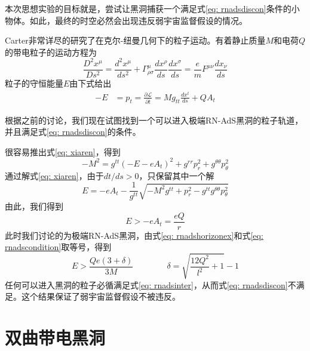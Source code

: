 本次思想实验的目标就是，尝试让黑洞捕获一个满足式\eqref{eq: rnadsdiscon}条件的小物体。如此，最终的时空必然会出现违反弱宇宙监督假设的情况\citep{wald1974gedanken}。

Carter非常详尽的研究了在克尔-纽曼几何下的粒子运动\cite{carter1968global}。有着静止质量$M$和电荷$Q$的带电粒子的运动方程为
\begin{equation}
    \frac{D^2x^\mu}{D s^2}=\frac{d^2x^\mu}{ds^2}+\Gamma^{\mu}_{\rho\sigma }\frac{dx^\rho}{ds}\frac{dx^\sigma}{ds}=\frac{e}{m}F^{\mu\nu }\frac{dx_\nu}{ds}
\end{equation}
粒子的守恒能量$E$由下式给出
\begin{align}
    -E&=p_t=\frac{\partial \mathcal{L}}{\partial \dot{t}}=Mg_{tt}\frac{dx^t}{ds}+QA_t 
\end{align}

根据之前的讨论，我们现在试图找到一个可以进入极端RN-AdS黑洞的粒子轨道，并且满足式\eqref{eq: rnadsdiscon}的条件。

很容易推出式\eqref{eq: xiaren}，得到
\begin{equation}\label{eq: xiaren}
    -M^2=g^{tt}\left(-E-eA_t\right)^2+g^{rr}p_r^2+g^{\theta \theta}p_\theta ^2
\end{equation}
通过解式\eqref{eq: xiaren}，由于$dt/ds>0$，只保留其中一个解
\begin{equation}\label{eq: rnadsguidao}
    E=-eA_t -\frac{1}{g^{tt}}\sqrt{-M^2g^{tt}+p_r^2-g^{tt}g^{\theta \theta}p_{\theta}^2}
\end{equation}
由此，我们得到
\begin{equation}
    E>-eA_t=\frac{eQ}{r}
\end{equation}
此时我们讨论的为极端RN-AdS黑洞，由式\eqref{eq: rnadshorizonex}和式\eqref{eq: rnadscondition}取等号，得到
\begin{equation}\label{eq: rnadsinter}
    E> \frac{Qe\left(3+\delta\right)}{3M} \qquad\qquad  \delta= \sqrt{\frac{12 Q^2}{l^2}+1}-1
\end{equation}
任何可以进入黑洞的粒子必循满足式\eqref{eq: rnadsinter}，从而式\eqref{eq: rnadsdiscon}不满足。这个结果保证了弱宇宙监督假设不被违反。

\section{双曲带电黑洞}
